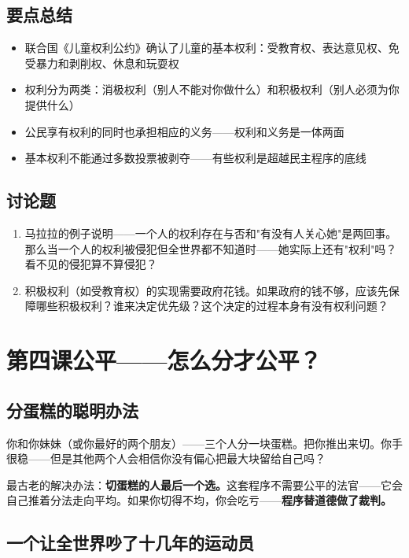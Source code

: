 \documentclass[a4paper,12pt]{ctexart}
\begin{document}
\subsection*{要点总结}
\begin{itemize}
  \item 联合国《儿童权利公约》确认了儿童的基本权利：受教育权、表达意见权、免受暴力和剥削权、休息和玩耍权
  \item 权利分为两类：消极权利（别人不能对你做什么）和积极权利（别人必须为你提供什么）
  \item 公民享有权利的同时也承担相应的义务——权利和义务是一体两面
  \item 基本权利不能通过多数投票被剥夺——有些权利是超越民主程序的底线
\end{itemize}

\subsection*{讨论题}
\begin{enumerate}
  \item 马拉拉的例子说明——一个人的权利存在与否和"有没有人关心她"是两回事。那么当一个人的权利被侵犯但全世界都不知道时——她实际上还有"权利"吗？看不见的侵犯算不算侵犯？
  \item 积极权利（如受教育权）的实现需要政府花钱。如果政府的钱不够，应该先保障哪些积极权利？谁来决定优先级？这个决定的过程本身有没有权利问题？
\end{enumerate}

\newpage
\section{\textcolor{orange!80!black}{第四课\quad 公平——怎么分才公平？}}

\subsection*{分蛋糕的聪明办法}

你和你妹妹（或你最好的两个朋友）——三个人分一块蛋糕。把你推出来切。你手很稳——但是其他两个人会相信你没有偏心把最大块留给自己吗？

最古老的解决办法：\textbf{切蛋糕的人最后一个选。}这套程序不需要公平的法官——它会自己推着分法走向平均。如果你切得不均，你会吃亏——\textbf{程序替道德做了裁判。}

\subsection*{一个让全世界吵了十几年的运动员}
\end{document}
